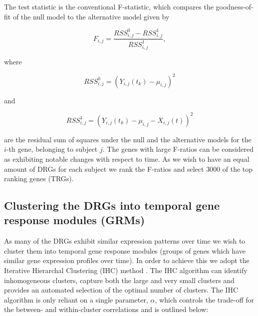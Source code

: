 The test statistic is the conventional F-statistic, which compares the goodness-of-fit of the null model to the alternative model given by

\begin{equation}
\label{eq:altmodel}
F_{i,j}=\frac{RSS_{i,j}^0-RSS_{i,j}^1}{RSS_{i,j}^1},
\end{equation}

where 

\begin{equation} 
RSS_{i,j}^0= (Y_{i,j}(t_{k}) -\mu_{i,j} )^{2}
\end{equation}

and

\begin{equation} RSS_{i,j}^1=(Y_{i,j}(t_{k}) -\mu_{i,j} - X_{i,j}(t))^{2} \end{equation}

are the residual sum of squares under the null and the alternative models for the $i$-th gene, belonging to subject $j$. The genes with large F-ratios can be considered as exhibiting notable changes with respect to time. As we wish to have an equal amount of DRGs for each subject we rank the F-ratios and select $3000$ of the top ranking genes (TRGs).

\subsection{Clustering the DRGs into temporal gene response modules (GRMs)}
\label{section:identification_of_grms}

As many of the DRGs exhibit similar expression patterns over time we wish to cluster them into temporal gene response modules (groups of genes which have similar gene expression profiles over time). In order to achieve this we adopt the Iterative Hierarchal Clustering (IHC) method \citep{careycluster}. The IHC algorithm can identify inhomogeneous clusters, capture both the large and very small clusters and provides an automated selection of the optimal number of clusters. The IHC algorithm is only reliant on a single parameter, $\alpha$, which controls the trade-off for the between- and within-cluster correlations and is outlined below:

